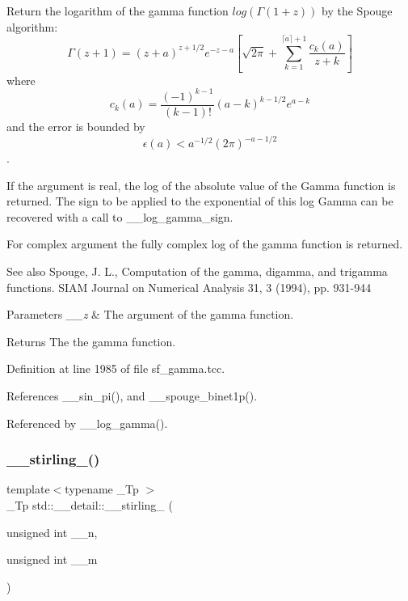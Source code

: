 Return the logarithm of the gamma function $ log(\Gamma(1+z)) $ by the Spouge algorithm\+: \[ \Gamma(z+1) = (z+a)^{z+1/2}e^{-z-a}\left[ \sqrt{2\pi} + \sum_{k=1}^{\lceil a \rceil + 1}\frac{c_k(a)}{z+k}\right] \] where \[ c_k(a) = \frac{(-1)^{k-1}}{(k-1)!}(a-k)^{k-1/2}e^{a-k} \] and the error is bounded by \[ \epsilon(a) < a^{-1/2}(2\pi)^{-a-1/2} \]. 

If the argument is real, the log of the absolute value of the Gamma function is returned. The sign to be applied to the exponential of this log Gamma can be recovered with a call to \+\_\+\+\_\+log\+\_\+gamma\+\_\+sign.

For complex argument the fully complex log of the gamma function is returned.

\begin{DoxySeeAlso}{See also}
Spouge, J. L., Computation of the gamma, digamma, and trigamma functions. S\+I\+AM Journal on Numerical Analysis 31, 3 (1994), pp. 931-\/944
\end{DoxySeeAlso}

\begin{DoxyParams}{Parameters}
{\em \+\_\+\+\_\+z} & The argument of the gamma function. \\
\hline
\end{DoxyParams}
\begin{DoxyReturn}{Returns}
The the gamma function. 
\end{DoxyReturn}


Definition at line 1985 of file sf\+\_\+gamma.\+tcc.



References \+\_\+\+\_\+sin\+\_\+pi(), and \+\_\+\+\_\+spouge\+\_\+binet1p().



Referenced by \+\_\+\+\_\+log\+\_\+gamma().

\mbox{\label{namespacestd_1_1____detail_a8b215e4ca28ec9b7b078d7f3d9aecc17}} 
\subsubsection{\texorpdfstring{\+\_\+\+\_\+stirling\+\_()}{\_\_stirling\_1()}\hspace{0.1cm}{\footnotesize\ttfamily [1/2]}}
{\footnotesize\ttfamily template$<$typename \+\_\+\+Tp $>$ \\
\+\_\+\+Tp std\+::\+\_\+\+\_\+detail\+::\+\_\+\+\_\+stirling\+\_ (\begin{DoxyParamCaption}\item[{unsigned int}]{\+\_\+\+\_\+n,  }\item[{unsigned int}]{\+\_\+\+\_\+m }\end{DoxyParamCaption})}


